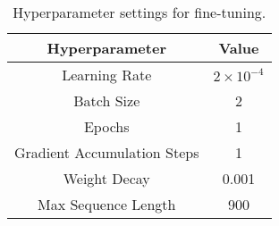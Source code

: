 \begin{table}[ht]
\centering
\footnotesize
\begin{tabular}{|c|c|}
\hline
\textbf{Hyperparameter} & \textbf{Value} \\
\hline
Learning Rate & $2 \times 10^{-4}$ \\
Batch Size & 2 \\
Epochs & 1 \\
Gradient Accumulation Steps & 1 \\
Weight Decay & 0.001 \\
Max Sequence Length & 900 \\
\hline
\end{tabular}
\caption{Hyperparameter settings for fine-tuning.}
\label{table:hyperparameters}
\end{table}